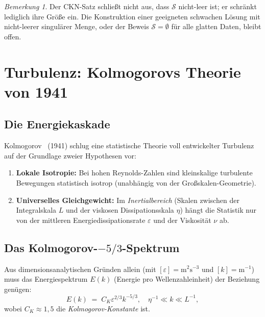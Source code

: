 \documentclass[12pt,a4paper]{article}
\theoremstyle{remark}
\newtheorem{remark}[theorem]{Bemerkung}
\begin{document}
\begin{remark}
  Der CKN-Satz schließt nicht aus, dass $\mathcal{S}$ nicht-leer ist; er schränkt lediglich
  ihre Größe ein. Die Konstruktion einer geeigneten schwachen Lösung mit nicht-leerer
  singulärer Menge, oder der Beweis $\mathcal{S} = \emptyset$ für alle glatten Daten,
  bleibt offen.
\end{remark}

\section{Turbulenz: Kolmogorovs Theorie von 1941}

\subsection{Die Energiekaskade}

Kolmogorov~\cite{Kolmogorov1941} (1941) schlug eine statistische Theorie voll entwickelter
Turbulenz auf der Grundlage zweier Hypothesen vor:
\begin{enumerate}[nosep]
  \item \textbf{Lokale Isotropie:} Bei hohen Reynolds-Zahlen sind kleinskalige turbulente
    Bewegungen statistisch isotrop (unabhängig von der Großskalen-Geometrie).
  \item \textbf{Universelles Gleichgewicht:} Im \emph{Inertialbereich} (Skalen zwischen
    der Integralskala $L$ und der viskosen Dissipationsskala $\eta$) hängt die Statistik
    nur von der mittleren Energiedissipationsrate $\varepsilon$ und der Viskosität $\nu$ ab.
\end{enumerate}

\subsection{Das Kolmogorov-$-5/3$-Spektrum}

Aus dimensionsanalytischen Gründen allein (mit $[\varepsilon] = \text{m}^2\text{s}^{-3}$
und $[k] = \text{m}^{-1}$) muss das Energiespektrum $E(k)$ (Energie pro Wellenzahleinheit)
der Beziehung genügen:
\begin{equation}\label{eq:k41}
  E(k) \;=\; C_K \varepsilon^{2/3} k^{-5/3}, \quad \eta^{-1} \ll k \ll L^{-1},
\end{equation}
wobei $C_K \approx 1{,}5$ die \emph{Kolmogorov-Konstante} ist.
\end{document}
